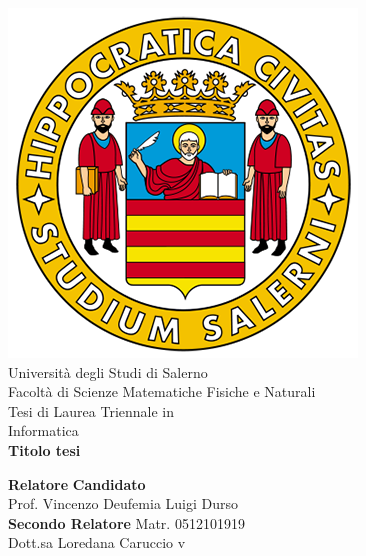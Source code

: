 \begin{center}
    \includegraphics[scale = 0.3]{Immagini/logoUnisa.png}\\
    \vspace{1cm}
    {\Large Università degli Studi di Salerno}\\[0.2truecm]
    {\large Facoltà di Scienze Matematiche Fisiche e Naturali}\\
    \hrulefill
    \vfill
    {\large Tesi di Laurea Triennale in }\\[0.2truecm]
    {\Large Informatica}\\
    \vfill\vfill
    {\large \bf Titolo tesi}
    \vfill\vfill
    
    
    {\bf Relatore} \hfill {\bf Candidato} \\
    Prof. Vincenzo Deufemia \hfill Luigi Durso \\
    {\bf Secondo Relatore}
    \hfill Matr. 0512101919\\
    
    
    Dott.sa Loredana Caruccio  \hfill {\phantom v} \\
    \vspace{1cm}
    \hrulefill 
\end{center}